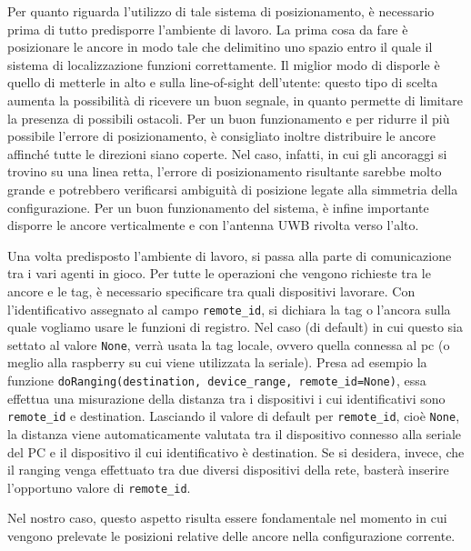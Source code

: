 Per quanto riguarda l'utilizzo di tale sistema di posizionamento, è necessario prima di tutto predisporre l'ambiente di lavoro.
La prima cosa da fare è posizionare le ancore in modo tale che delimitino uno spazio entro il quale il sistema di localizzazione funzioni correttamente. 
Il miglior modo di disporle è quello di metterle in alto e sulla line-of-sight dell’utente: questo tipo di scelta aumenta la possibilità di ricevere un buon segnale, in quanto permette di limitare la presenza di possibili ostacoli. 
Per un buon funzionamento e per ridurre il più possibile l'errore di posizionamento, è consigliato inoltre distribuire le ancore affinché tutte le 
direzioni siano coperte.
Nel caso, infatti, in cui gli ancoraggi si trovino su una linea retta, l'errore di posizionamento risultante sarebbe molto grande e potrebbero verificarsi ambiguità di posizione legate alla simmetria della configurazione.
Per un buon funzionamento del sistema, è infine importante disporre le ancore verticalmente e con l’antenna UWB rivolta verso l’alto.

Una volta predisposto l'ambiente di lavoro, si passa alla parte di comunicazione tra i vari agenti in gioco. Per tutte le operazioni che vengono richieste 
tra le ancore e le tag, è necessario specificare tra quali dispositivi lavorare. 
Con l'identificativo assegnato al campo \verb|remote_id|, si dichiara la tag o l'ancora sulla quale vogliamo usare le funzioni di registro. Nel caso (di default) 
in cui questo sia settato al valore \verb|None|, verrà usata la tag locale, ovvero quella connessa al pc (o meglio alla raspberry su cui viene utilizzata la seriale).
Presa ad esempio la funzione \texttt{doRanging(destination, device\_range, remote\_id=None)}, essa effettua una misurazione della distanza tra i dispositivi
i cui identificativi sono \verb|remote_id| e destination. 
Lasciando il valore di default per \verb|remote_id|, cioè \verb|None|, la distanza viene automaticamente
valutata tra il dispositivo connesso alla seriale del PC e il dispositivo il cui identificativo è destination. 
Se si desidera, invece, che il ranging venga effettuato tra due diversi dispositivi della rete, basterà inserire l’opportuno valore di \verb|remote_id|.

Nel nostro caso, questo aspetto risulta essere fondamentale nel momento in cui vengono prelevate le posizioni relative delle ancore nella configurazione corrente. 

